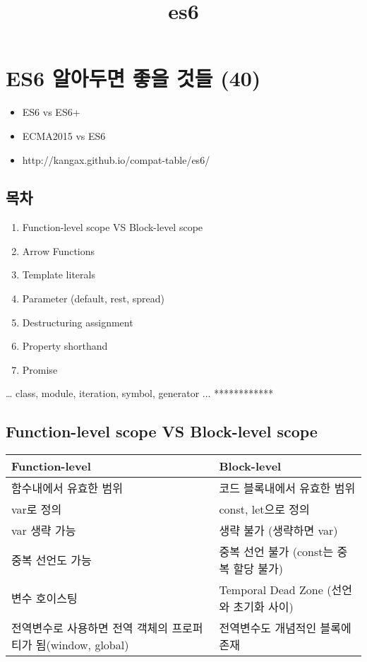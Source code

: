 \documentclass[11pt]{article}
\title{es6}
\providecommand{\tightlist}{%
      \setlength{\itemsep}{0pt}\setlength{\parskip}{0pt}}
\begin{document}
    
    
    \maketitle
    
    

    
    \section{ES6 알아두면 좋을 것들
(40)}\label{es6-uxc54cuxc544uxb450uxba74-uxc88buxc744-uxac83uxb4e4-40}

\begin{itemize}
\tightlist
\item
  ES6 vs ES6+
\item
  ECMA2015 vs ES6
\item
  http://kangax.github.io/compat-table/es6/
\end{itemize}

\subsection{목차}\label{uxbaa9uxcc28}

\begin{enumerate}
\def\labelenumi{\arabic{enumi}.}
\tightlist
\item
  Function-level scope VS Block-level scope
\item
  Arrow Functions
\item
  Template literals
\item
  Parameter (default, rest, spread)
\item
  Destructuring assignment
\item
  Property shorthand
\item
  Promise
\end{enumerate}

\ldots{} class, module, iteration, symbol, generator ... ************

    \subsection{Function-level scope VS Block-level
scope}\label{function-level-scope-vs-block-level-scope}

\begin{longtable}[]{@{}ll@{}}
\toprule
Function-level & Block-level\tabularnewline
\midrule
\endhead
함수내에서 유효한 범위 & 코드 블록내에서 유효한 범위\tabularnewline
var로 정의 & const, let으로 정의\tabularnewline
var 생략 가능 & 생략 불가 (생략하면 var)\tabularnewline
중복 선언도 가능 & 중복 선언 불가 (const는 중복 할당
불가)\tabularnewline
변수 호이스팅 & Temporal Dead Zone (선언와 초기화 사이)\tabularnewline
전역변수로 사용하면 전역 객체의 프로퍼티가 됨(window, global) &
전역변수도 개념적인 블록에 존재\tabularnewline
\bottomrule
\end{longtable}
\end{document}
